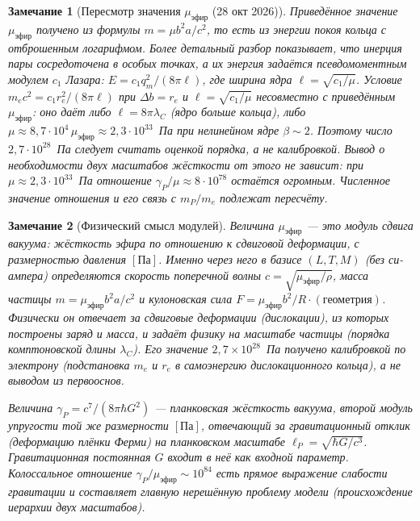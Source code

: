 \documentclass[12pt,a4paper]{article}
\newtheorem{remark}{Замечание}
\begin{document}
\begin{remark}[Пересмотр значения $\mu_{\text{эфир}}$ (28 окт 2026)]
Приведённое значение $\mu_{\text{эфир}}$ получено из формулы $m=\mu b^2a/c^2$, то
есть из энергии покоя кольца с отброшенным логарифмом. Более детальный разбор
показывает, что инерция пары сосредоточена в особых точках, а их энергия задаётся
псевдомоментным модулем $c_1$ Лазара: $E=c_1q_m^2/(8\pi\ell)$, где ширина ядра
$\ell=\sqrt{c_1/\mu}$. Условие $m_ec^2=c_1r_e^2/(8\pi\ell)$ при $\Delta b=r_e$ и
$\ell=\sqrt{c_1/\mu}$ несовместно с приведённым $\mu_{\text{эфир}}$: оно даёт либо
$\ell=8\pi\lambda_C$ (ядро больше кольца), либо $\mu\approx8{,}7\cdot10^4\,\mu_{\text{эфир}}
\approx2{,}3\cdot10^{33}$~Па при нелинейном ядре $\beta\sim2$. Поэтому число
$2{,}7\cdot10^{28}$~Па следует считать оценкой порядка, а не калибровкой. Вывод
о \emph{необходимости} двух масштабов жёсткости от этого не зависит: при
$\mu\approx2{,}3\cdot10^{33}$~Па отношение $\gamma_P/\mu\approx8\cdot10^{78}$
остаётся огромным. Численное значение отношения и его связь с $m_P/m_e$
подлежат пересчёту.
\end{remark}

\begin{remark}[Физический смысл модулей]
Величина $\mu_{\text{эфир}}$ --- это \emph{модуль сдвига вакуума}: жёсткость
эфира по отношению к сдвиговой деформации, с размерностью давления
$[\text{Па}]$. Именно через него в базисе $(L,T,M)$ (без си-ампера)
определяются скорость поперечной волны $c=\sqrt{\mu_{\text{эфир}}/\rho}$, масса
частицы $m=\mu_{\text{эфир}}b^2a/c^2$ и кулоновская сила
$F=\mu_{\text{эфир}}b^2/R\cdot(\text{геометрия})$. Физически он отвечает за
сдвиговые деформации (дислокации), из которых построены заряд и масса, и задаёт
физику на масштабе частицы (порядка комптоновской длины $\lambda_C$). Его
значение $2{,}7\times10^{28}$~Па получено \emph{калибровкой} по электрону
(подстановка $m_e$ и $r_e$ в самоэнергию дислокационного кольца), а не выводом
из первооснов.

Величина $\gamma_P=c^7/(8\pi\hbar G^2)$ --- \emph{планковская жёсткость
вакуума}, второй модуль упругости той же размерности $[\text{Па}]$, отвечающий
за гравитационный отклик (деформацию плёнки Ферми) на планковском масштабе
$\ell_P=\sqrt{\hbar G/c^3}$. Гравитационная постоянная $G$ входит в неё как
\emph{входной} параметр. Колоссальное отношение
$\gamma_P/\mu_{\text{эфир}}\sim10^{84}$ есть прямое выражение слабости
гравитации и составляет главную нерешённую проблему модели (происхождение
иерархии двух масштабов).
\end{remark}
\end{document}
